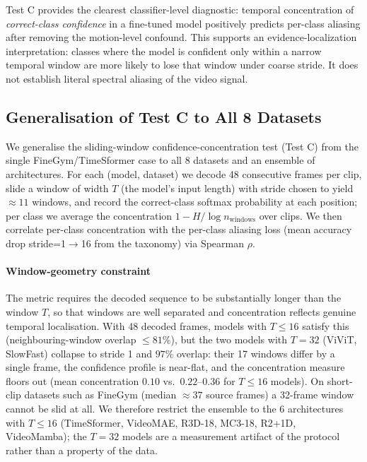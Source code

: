 \documentclass[a4paper, 10pt, conference, onecolumn]{ieeeconf}
\begin{document}
Test C provides the clearest classifier-level diagnostic: temporal concentration of \emph{correct-class confidence} in a fine-tuned model positively predicts per-class aliasing after removing the motion-level confound. This supports an evidence-localization interpretation: classes where the model is confident only within a narrow temporal window are more likely to lose that window under coarse stride. It does not establish literal spectral aliasing of the video signal.

\subsection*{Generalisation of Test C to All 8 Datasets}
\label{sec:sup_sw_generalisation}

We generalise the sliding-window confidence-concentration test (Test C) from the single FineGym/TimeSformer case to all 8 datasets and an ensemble of architectures. For each (model, dataset) we decode 48 consecutive frames per clip, slide a window of width $T$ (the model's input length) with stride chosen to yield ${\approx}11$ windows, and record the correct-class softmax probability at each position; per class we average the concentration $1-H/\log n_\mathrm{windows}$ over clips. We then correlate per-class concentration with the per-class aliasing loss (mean accuracy drop stride=1$\to$16 from the taxonomy) via Spearman $\rho$.

\paragraph{Window-geometry constraint} The metric requires the decoded sequence to be substantially longer than the window $T$, so that windows are well separated and concentration reflects genuine temporal localisation. With 48 decoded frames, models with $T\le16$ satisfy this (neighbouring-window overlap $\le81\%$), but the two models with $T=32$ (ViViT, SlowFast) collapse to stride 1 and $97\%$ overlap: their 17 windows differ by a single frame, the confidence profile is near-flat, and the concentration measure floors out (mean concentration $0.10$ vs.\ $0.22$--$0.36$ for $T\le16$ models). On short-clip datasets such as FineGym (median ${\approx}37$ source frames) a 32-frame window cannot be slid at all. We therefore restrict the ensemble to the 6 architectures with $T\le16$ (TimeSformer, VideoMAE, R3D-18, MC3-18, R2+1D, VideoMamba); the $T=32$ models are a measurement artifact of the protocol rather than a property of the data.
\end{document}
